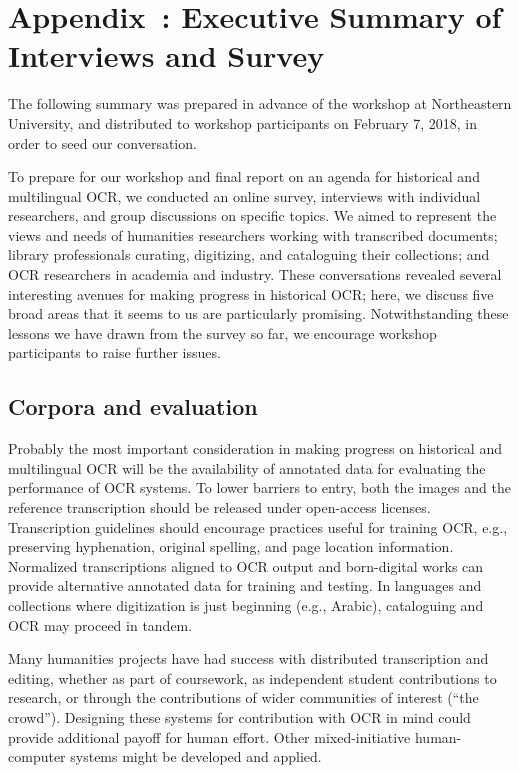 \documentclass[twoside,11pt]{report}
\newcounter{appcounter}
\renewcommand{\theappcounter}{\Alph{appcounter}}
\renewcommand{\appendix}[2]{\refstepcounter{appcounter}%
  \label{app:#1}%
  \section{Appendix~\theappcounter: #2}%
  \label{sec:app-#1}}
\begin{document}
\appendix{exec-summary}{Executive Summary of Interviews and Survey}

The following summary was prepared in advance of the workshop at Northeastern University, and distributed to workshop participants on February 7, 2018, in order to seed our conversation.

To prepare for our workshop and final report on an agenda for historical and multilingual OCR, we conducted an online survey, interviews with individual researchers, and group discussions on specific topics. We aimed to represent the views and needs of humanities researchers working with transcribed documents; library professionals curating, digitizing, and cataloguing their collections; and OCR researchers in academia and industry. These conversations revealed several interesting avenues for making progress in historical OCR; here, we discuss five broad areas that it seems to us are particularly promising. Notwithstanding these lessons we have drawn from the survey so far, we encourage workshop participants to raise further issues.

\subsection{Corpora and evaluation}

Probably the most important consideration in making progress on historical and multilingual OCR will be the availability of annotated data for evaluating the performance of OCR systems. To lower barriers to entry, both the images and the reference transcription should be released  under open-access licenses. Transcription guidelines should encourage practices useful for training OCR, e.g., preserving hyphenation, original spelling, and page location information. Normalized transcriptions aligned to OCR output and born-digital works can provide alternative annotated data for training and testing. In languages and collections where digitization is just beginning (e.g., Arabic), cataloguing and OCR may proceed in tandem.

Many humanities projects have had success with distributed transcription and editing, whether as part of coursework, as independent student contributions to research, or through the contributions of wider communities of interest (``the crowd''). Designing these systems for contribution with OCR in mind could provide additional payoff for human effort. Other mixed-initiative human-computer systems might be developed and applied.
\end{document}
